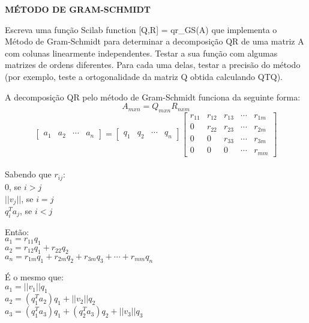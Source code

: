 \documentclass[leqno]{article}
\numberwithin{equation}{section}
\begin{document}
		\noindent\textbf{{\large MÉTODO DE GRAM-SCHMIDT}}\\
		
		\begin{tcolorbox}[colback=green!5,colframe=green!40!black]
			Escreva uma função Scilab function [Q,R] = qr\_GS(A) que implementa o Método de Gram-Schmidt para determinar a decomposição QR de uma matriz A com colunas linearmente independentes.
			Testar a sua função com algumas matrizes de ordens diferentes. Para cada uma delas, testar a precisão do método (por exemplo, teste a ortogonalidade da matriz Q obtida calculando QTQ).
		\end{tcolorbox}
	
		\noindent A decomposição QR pelo método de Gram-Schmidt funciona da seguinte forma: 
		$$A_{m x n} =  Q_{m x n}R_{n x m}$$
		$$\begin{bmatrix}
			a_1 & a_2 & \cdots & a_n
		\end{bmatrix} = \begin{bmatrix}
			q_1 & q_2 & \cdots & q_n
		\end{bmatrix}\begin{bmatrix}
			r_{11} & r_{12} & r_{13} & \cdots & r_{1m} \\
			0 & r_{22} & r_{23} & \cdots & r_{2m} \\
			0 & 0 & r_{33} & \cdots & r_{3m} \\
			0 & 0 & 0 & \cdots & r_{mm}
		\end{bmatrix}$$\\
		
		\vspace{0.3cm}
		\noindent Sabendo que $r_{ij}$:\\
		$0$, se $i>j$\\
		$||v_{j}||$, se $i = j$\\
		$q_{i}^T a_j$, se $i < j$
		
		\vspace{0.3cm}
		\noindent Então:\\
		$a_1 = r_{11} q_{1}$\\
		$a_2 = r_{12} q_{1} + r_{22} q_{2}$\\
		$a_n = r_{1m} q_{1} + r_{2m} q_{2} + r_{3m} q_{3} + \cdots + r_{mm} q_{n}$
		
		\vspace{0.3cm}
		\noindent É o mesmo que:\\
		$a_1 = ||v_1||q_1$\\
		$a_2 = (q_{1}^T a_2) q_1 + ||v_2||q_2$\\
		$a_3 = (q_{1}^T a_3) q_1 + (q_{2}^T a_3)q_2 + ||v_3||q_3$
\end{document}
